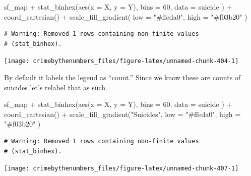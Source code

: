 \documentclass[
  a4paper,
]{krantz}
\makeatletter
\newenvironment{Shaded}{\begin{snugshade}}{\end{snugshade}}
\newcommand{\AttributeTok}[1]{\textcolor[rgb]{0.77,0.63,0.00}{#1}}
\newcommand{\DecValTok}[1]{\textcolor[rgb]{0.00,0.00,0.81}{#1}}
\newcommand{\FunctionTok}[1]{\textcolor[rgb]{0.00,0.00,0.00}{#1}}
\newcommand{\NormalTok}[1]{#1}
\newcommand{\SpecialCharTok}[1]{\textcolor[rgb]{0.00,0.00,0.00}{#1}}
\newcommand{\StringTok}[1]{\textcolor[rgb]{0.31,0.60,0.02}{#1}}
\newenvironment{kframe}{%
\medskip{}
\setlength{\fboxsep}{.8em}
 \def\at@end@of@kframe{}%
 \ifinner\ifhmode%
  \def\at@end@of@kframe{\end{minipage}}%
  \begin{minipage}{\columnwidth}%
 \fi\fi%
 \def\FrameCommand##1{\hskip\@totalleftmargin \hskip-\fboxsep
 \colorbox{shadecolor}{##1}\hskip-\fboxsep
     \hskip-\linewidth \hskip-\@totalleftmargin \hskip\columnwidth}%
 \MakeFramed {\advance\hsize-\width
   \@totalleftmargin\z@ \linewidth\hsize
   \@setminipage}}%
 {\par\unskip\endMakeFramed%
 \at@end@of@kframe}
\renewenvironment{Shaded}{\begin{kframe}}{\end{kframe}}
\makeatother
\begin{document}
\begin{Shaded}
\begin{Highlighting}[]
\NormalTok{sf\_map }\SpecialCharTok{+}
  \FunctionTok{stat\_binhex}\NormalTok{(}\FunctionTok{aes}\NormalTok{(}\AttributeTok{x =}\NormalTok{ X, }\AttributeTok{y =}\NormalTok{ Y),}
    \AttributeTok{bins =} \DecValTok{60}\NormalTok{,}
    \AttributeTok{data =}\NormalTok{ suicide}
\NormalTok{  ) }\SpecialCharTok{+}
  \FunctionTok{coord\_cartesian}\NormalTok{() }\SpecialCharTok{+}
  \FunctionTok{scale\_fill\_gradient}\NormalTok{(}
    \AttributeTok{low =} \StringTok{"\#ffeda0"}\NormalTok{,}
    \AttributeTok{high =} \StringTok{"\#f03b20"}
\NormalTok{  )}
\end{Highlighting}
\end{Shaded}

\begin{verbatim}
# Warning: Removed 1 rows containing non-finite values
# (stat_binhex).
\end{verbatim}

\begin{center}\texttt{[image: crimebythenumbers\_files/figure-latex/unnamed-chunk-404-1]} \end{center}

By default it labels the legend as ``count.'' Since we know
these are counts of suicides let's relabel that as such.

\begin{Shaded}
\begin{Highlighting}[]
\NormalTok{sf\_map }\SpecialCharTok{+}
  \FunctionTok{stat\_binhex}\NormalTok{(}\FunctionTok{aes}\NormalTok{(}\AttributeTok{x =}\NormalTok{ X, }\AttributeTok{y =}\NormalTok{ Y),}
    \AttributeTok{bins =} \DecValTok{60}\NormalTok{,}
    \AttributeTok{data =}\NormalTok{ suicide}
\NormalTok{  ) }\SpecialCharTok{+}
  \FunctionTok{coord\_cartesian}\NormalTok{() }\SpecialCharTok{+}
  \FunctionTok{scale\_fill\_gradient}\NormalTok{(}\StringTok{"Suicides"}\NormalTok{,}
    \AttributeTok{low =} \StringTok{"\#ffeda0"}\NormalTok{,}
    \AttributeTok{high =} \StringTok{"\#f03b20"}
\NormalTok{  )}
\end{Highlighting}
\end{Shaded}

\begin{verbatim}
# Warning: Removed 1 rows containing non-finite values
# (stat_binhex).
\end{verbatim}

\begin{center}\texttt{[image: crimebythenumbers\_files/figure-latex/unnamed-chunk-407-1]} \end{center}
\end{document}
